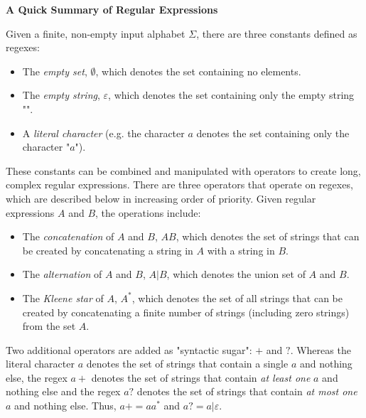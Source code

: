 \begin{tcolorbox}[breakable, enhanced, colback=textbook-blue, sharp corners]
	\vspace{2mm}
	\begin{center}
		\textbf{A Quick Summary of Regular Expressions}
	\end{center}
	\vspace{1mm}

	Given a finite, non-empty input alphabet $\Sigma$, there are three constants defined as regexes:
	
	\begin{itemize}
		\item The \textit{empty set}, $\emptyset$, which denotes the set containing no elements.
		\item The \textit{empty string}, $\varepsilon$, which denotes the set containing only the empty string "".
		\item A \textit{literal character} (e.g. the character $a$ denotes the set containing only the character "$a$").
	\end{itemize}
	
	These constants can be combined and manipulated with operators to create long, complex regular expressions. There are three operators that operate on regexes, which are described below in increasing order of priority. Given regular expressions $A$ and $B$, the operations include:
	
	\begin{itemize}
		\item The \textit{concatenation} of $A$ and $B$, $AB$, which denotes the set of strings that can be created by concatenating a string in $A$ with a string in $B$.
		\item The \textit{alternation} of $A$ and $B$, $A|B$, which denotes the union set of $A$ and $B$.
		\item The \textit{Kleene star} of $A$, $A^*$, which denotes the set of all strings that can be created by concatenating a finite number of strings (including zero strings) from the set $A$.
	\end{itemize}
	
	Two additional operators are added as "syntactic sugar": $+$ and $?$. Whereas the literal character $a$ denotes the set of strings that contain a single $a$ and nothing else, the regex $a+$ denotes the set of strings that contain \textit{at least one} $a$ and nothing else and the regex $a?$ denotes the set of strings that contain \textit{at most one} $a$ and nothing else. Thus, $a+=aa^*$ and $a?=a|\varepsilon$. \\
	

\end{tcolorbox}
